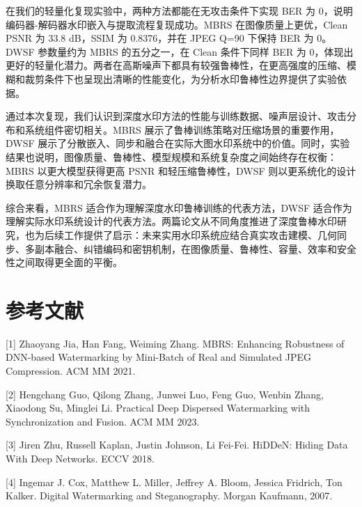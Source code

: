 ﻿\documentclass[UTF8,zihao=5]{ctexart}
\begin{document}
在我们的轻量化复现实验中，两种方法都能在无攻击条件下实现 BER 为 0，说明编码器-解码器水印嵌入与提取流程复现成功。MBRS 在图像质量上更优，Clean PSNR 为 33.8 dB，SSIM 为 0.8376，并在 JPEG Q=90 下保持 BER 为 0。DWSF 参数量约为 MBRS 的五分之一，在 Clean 条件下同样 BER 为 0，体现出更好的轻量化潜力。两者在高斯噪声下都具有较强鲁棒性，在更高强度的压缩、模糊和裁剪条件下也呈现出清晰的性能变化，为分析水印鲁棒性边界提供了实验依据。

通过本次复现，我们认识到深度水印方法的性能与训练数据、噪声层设计、攻击分布和系统组件密切相关。MBRS 展示了鲁棒训练策略对压缩场景的重要作用，DWSF 展示了分散嵌入、同步和融合在实际大图水印系统中的价值。同时，实验结果也说明，图像质量、鲁棒性、模型规模和系统复杂度之间始终存在权衡：MBRS 以更大模型获得更高 PSNR 和轻压缩鲁棒性，DWSF 则以更系统化的设计换取任意分辨率和冗余恢复潜力。

综合来看，MBRS 适合作为理解深度水印鲁棒训练的代表方法，DWSF 适合作为理解实际水印系统设计的代表方法。两篇论文从不同角度推进了深度鲁棒水印研究，也为后续工作提供了启示：未来实用水印系统应结合真实攻击建模、几何同步、多副本融合、纠错编码和密钥机制，在图像质量、鲁棒性、容量、效率和安全性之间取得更全面的平衡。


\section{参考文献}

[1] Zhaoyang Jia, Han Fang, Weiming Zhang. MBRS: Enhancing Robustness of DNN-based Watermarking by Mini-Batch of Real and Simulated JPEG Compression. ACM MM 2021.

[2] Hengchang Guo, Qilong Zhang, Junwei Luo, Feng Guo, Wenbin Zhang, Xiaodong Su, Minglei Li. Practical Deep Dispersed Watermarking with Synchronization and Fusion. ACM MM 2023.

[3] Jiren Zhu, Russell Kaplan, Justin Johnson, Li Fei-Fei. HiDDeN: Hiding Data With Deep Networks. ECCV 2018.

[4] Ingemar J. Cox, Matthew L. Miller, Jeffrey A. Bloom, Jessica Fridrich, Ton Kalker. Digital Watermarking and Steganography. Morgan Kaufmann, 2007.
\end{document}
